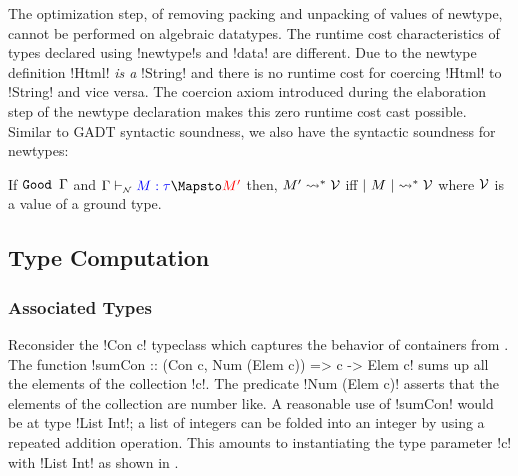 \documentclass[screen,nonacm,manuscript,review]{acmart} %
\begin{document}
The optimization step, of removing packing and unpacking of values of newtype,
cannot be performed on algebraic datatypes.
The runtime cost characteristics of types declared using
!newtype!s and !data! are different. Due to the newtype definition
!Html! \emph{is a} !String! and there is no runtime cost
for coercing !Html! to !String! and vice versa.
The coercion axiom introduced during the elaboration step of the
newtype declaration makes this zero runtime cost cast possible.
Similar to GADT syntactic soundness, we also have the syntactic
soundness for newtypes:

\begin{theorem}\label{lem:nt-syntax-soundness}
 If $\texttt{Good~}\Gamma$ and $\NTTranslate {\TEnv} \Tm \tau {\Tm'}$ then, $M' \rightsquigarrow^* \mathcal{V}$ iff $|~{M}~| \rightsquigarrow^* \mathcal{V}$ where $\mathcal{V}$ is a value of
 a ground type.
\end{theorem}

\subsection{Type Computation}
\subsubsection{Associated Types}\label{sec:fc-encodes-assoctypes}
Reconsider the !Con c! typeclass which captures the behavior of
containers from .
The function !sumCon :: (Con c, Num (Elem c)) => c -> Elem c!
sums up all the elements of the collection !c!.
The predicate !Num (Elem c)! asserts that the elements
of the collection are number like. A reasonable use of !sumCon!
would be at type !List Int!; a list of integers can be folded
into an integer by using a repeated addition operation.
This amounts to instantiating the type parameter !c!
with !List Int! as shown in .
\end{document}
